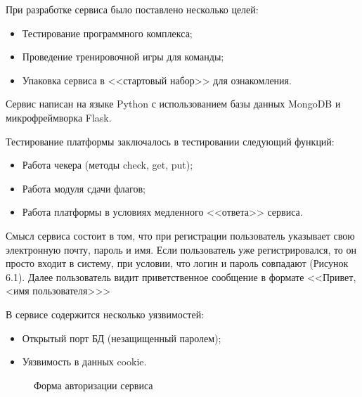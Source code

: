 При разработке сервиса было поставлено несколько целей:
\begin{itemize} 
\item Тестирование программного комплекса;
\item Проведение тренировочной игры для команды;
\item Упаковка сервиса в <<стартовый набор>> для ознакомления.
\end{itemize}

Сервис написан на языке Python с использованием базы данных MongoDB и микрофреймворка Flask.

Тестирование платформы заключалось в тестировании следующий функций:
\begin{itemize} 
\item Работа чекера (методы check, get, put);
\item Работа модуля сдачи флагов;
\item Работа платформы в условиях медленного <<ответа>> сервиса.
\end{itemize}

Смысл сервиса состоит в том, что при регистрации пользователь указывает свою электронную почту, пароль и имя.
Если пользователь уже регистрировался, то он просто входит в систему, при условии, что логин и пароль  совпадают (Рисунок 6.1). Далее пользователь видит приветственное сообщение в формате <<Привет, <имя пользователя>>>


В сервисе содержится несколько уязвимостей:
\begin{itemize} 
\item Открытый порт БД (незащищенный паролем);
\item Уязвимость в данных cookie.
\end{itemize}


\begin{figure}[ht!]
\caption{Форма авторизации сервиса}
\end{figure} 
\clearpage
